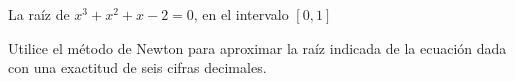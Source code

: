 \item La raíz de $x^3 + x^2 + x - 2 = 0$, en el intervalo $[0, 1]$
\par
Utilice el método de Newton para aproximar la raíz indicada de la ecuación dada con una exactitud de seis cifras decimales.
